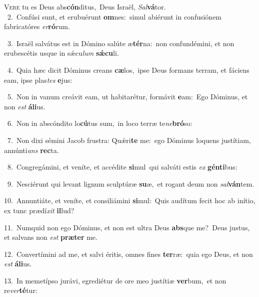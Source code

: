 \lettrine{\initial\textcolor{\initialcolor}{V}}{ere} tu es Deus abs\-\textbf{cón}\-ditus,~\star Deus Israël, \textit{Sal}\-\textbf{vá}tor.\\
{\numbfont\textcolor{\numbcolor}{~2.}}~Confúsi sunt, et erubuérunt \textbf{om}\-nes:~\star simul abiérunt in confusiónem fabricatóres \textit{er}\-\textbf{ró}rum.\par
{\numbfont\textcolor{\numbcolor}{~3.}}~Israël salvátus est in Dómino salúte æ\-\textbf{tér}\-na:~\star non confundémini, et non erubescétis usque in sǽcu\textit{lum} \textbf{sǽ}\-\textbf{cu}li.\par
{\numbfont\textcolor{\numbcolor}{~4.}}~Quia hæc dicit Dóminus creans \textbf{cæ}\-los,~\star ipse Deus formans terram, et fáciens eam, ipse plas\textit{tes} \textbf{e}\-jus:\par
{\numbfont\textcolor{\numbcolor}{~5.}}~Non in vanum creávit eam, ut habitarétur, formávit \textbf{e}\-am:~\star Ego Dóminus, et non \textit{est} \textbf{á}\-\textbf{li}us.\par
{\numbfont\textcolor{\numbcolor}{~6.}}~Non in abscóndito lo\-\textbf{cú}\-tus sum,~\star in loco terræ te\-\textit{ne}\-\textbf{bró}so:\par
{\numbfont\textcolor{\numbcolor}{~7.}}~Non dixi sémini Jacob frustra: Quǽri\textbf{te} me:~\star ego Dóminus loquens justítiam, annúnti\textit{ans} \textbf{rec}\-ta.\par
{\numbfont\textcolor{\numbcolor}{~8.}}~Congregámini, et veníte, et accédite \textbf{si}\-mul~\star qui salváti estis \textit{ex} \textbf{gén}\-\textbf{ti}bus:\par
{\numbfont\textcolor{\numbcolor}{~9.}}~Nesciérunt qui levant lignum sculptúræ \textbf{su}\-æ,~\star et rogant deum non \textit{sal}\-\textbf{ván}tem.\par
{\numbfont\textcolor{\numbcolor}{10.}}~Annuntiáte, et veníte, et consiliámini \textbf{si}\-mul:~\star Quis audítum fecit hoc ab inítio, ex tunc prædí\textit{xit} \textbf{il}\-lud?\par
{\numbfont\textcolor{\numbcolor}{11.}}~Numquid non ego Dóminus, et non est ultra Deus \textbf{abs}\-que me?~\star Deus justus, et salvans non \textit{est} \textbf{præ}\-\textbf{ter} me.\par
{\numbfont\textcolor{\numbcolor}{12.}}~Convertímini ad me, et salvi éritis, omnes fines \textbf{ter}\-ræ:~\star quia ego Deus, et non \textit{est} \textbf{á}\-\textbf{li}us.\par
{\numbfont\textcolor{\numbcolor}{13.}}~In memetípso jurávi, egrediétur de ore meo justítiæ \textbf{ver}\-bum,~\star et non re\-\textit{ver}\-\textbf{té}tur:\par
